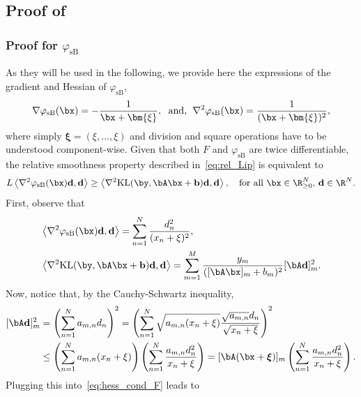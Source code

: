 \documentclass[11pt]{amsart}
\begin{document}
\subsection{Proof of~}\label{proof:rel_smooth_KL}

\subsubsection{\texorpdfstring{Proof for $\varphi_\mathrm{sB}$}{varphi=sBurg}}
As they will be used in the following, we provide here the expressions of the gradient and Hessian of $\varphi_\mathrm{sB}$,
\begin{equation}
    \nabla \varphi_\mathrm{sB}(\bx) = - \frac{1}{\bx + \bm{\xi} }, \; \text{ and, } \; \nabla^2\varphi_\mathrm{sB}(\bx) = \frac{1}{(\bx + \bm{\xi})^2},
\end{equation}
where simply $\boldsymbol{\xi}=(\xi,\ldots, \xi)$ and division and square operations have to be understood component-wise. Given that both $F$ and $\varphi_\mathrm{sB}$ are twice differentiable, the relative smoothness property described in~\cref{eq:rel_Lip} is equivalent to 
\begin{equation}
L \left<\nabla^2 \varphi_\mathrm{sB}(\bx)\mathbf{d},\mathbf{d}  \right>  \geq \left<\nabla^2 \mathrm{KL}(\by,\bA\bx+\mathbf{b})\mathbf{d},\mathbf{d} \right>, \quad \text{for all } \bx \in \R_{\geq 0}^N, \, \mathbf{d} \in \R^N.
\end{equation}
First, observe that
\begin{align}
& \left<\nabla^2 \varphi_\mathrm{sB}(\bx)\mathbf{d},\mathbf{d}  \right> = \sum_{n=1}^N \frac{d_n^2}{(x_n + \xi)^2}, \label{eq:hess_cond_h} \\ 
    & \left<\nabla^2 \mathrm{KL}(\by,\bA\bx+\mathbf{b})\mathbf{d},\mathbf{d} \right> = \sum_{m=1}^M \frac{y_m}{([\bA \bx]_m +b_m)^2} [\bA \mathbf{d}]_m^2. \label{eq:hess_cond_F}
\end{align}
Now, notice that, by the Cauchy-Schwartz inequality,
$$
\begin{aligned}
[\bA \mathbf{d}]_m^2&=\left(\sum_{n=1}^Na_{m,n}d_n\right)^2=\left(\sum_{n=1}^N\sqrt{a_{m,n}(x_n+\xi)}\frac{\sqrt{a_{m,n}}d_n}{\sqrt{x_n+\xi}}\right)^2\\
&\leq\left(\sum_{n=1}^N a_{m,n}(x_n+\xi)\right)\left(\sum_{n=1}^N\frac{a_{m,n}d_n^2}{x_n+\xi}\right)=[\bA(\bx+\boldsymbol{\xi})]_m\left(\sum_{n=1}^N\frac{a_{m,n}d_n^2}{x_n+\xi}\right).
\end{aligned}
$$
Plugging this into~\cref{eq:hess_cond_F} leads to
\end{document}

